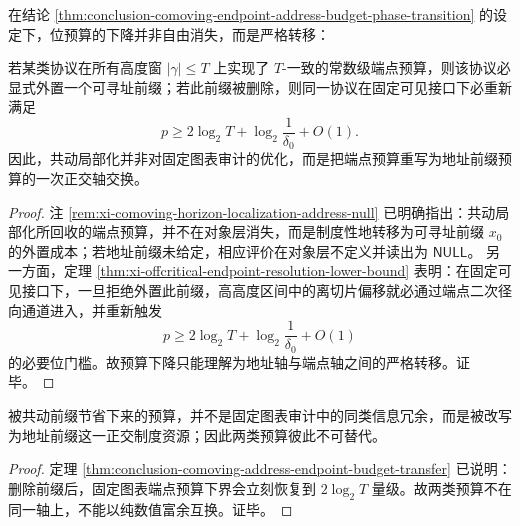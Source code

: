 \begin{theorem}[地址预算与端点预算的正交转移]\label{thm:conclusion-comoving-address-endpoint-budget-transfer}
在结论 \ref{thm:conclusion-comoving-endpoint-address-budget-phase-transition} 的设定下，位预算的下降并非自由消失，而是严格转移：

若某类协议在所有高度窗 \(|\gamma|\le T\) 上实现了 \(T\)-一致的常数级端点预算，则该协议必显式外置一个可寻址前缀；若此前缀被删除，则同一协议在固定可见接口下必重新满足
\[
p\ge 2\log_2T+\log_2\frac1{\delta_0}+O(1).
\]
因此，共动局部化并非对固定图表审计的优化，而是把端点预算重写为地址前缀预算的一次正交轴交换。
\end{theorem}
\begin{proof}
注 \ref{rem:xi-comoving-horizon-localization-address-null} 已明确指出：共动局部化所回收的端点预算，并不在对象层消失，而是制度性地转移为可寻址前缀 \(x_0\) 的外置成本；若地址前缀未给定，相应评价在对象层不定义并读出为 \(\mathsf{NULL}\)。
另一方面，定理 \ref{thm:xi-offcritical-endpoint-resolution-lower-bound} 表明：在固定可见接口下，一旦拒绝外置此前缀，高高度区间中的离切片偏移就必通过端点二次径向通道进入，并重新触发
\[
p\ge 2\log_2T+\log_2\frac1{\delta_0}+O(1)
\]
的必要位门槛。故预算下降只能理解为地址轴与端点轴之间的严格转移。证毕。
\end{proof}

\begin{corollary}[地址轴与端点轴的不可替代性]\label{cor:conclusion-comoving-address-endpoint-axis-exchange}
被共动前缀节省下来的预算，并不是固定图表审计中的同类信息冗余，而是被改写为地址前缀这一正交制度资源；因此两类预算彼此不可替代。
\end{corollary}
\begin{proof}
定理 \ref{thm:conclusion-comoving-address-endpoint-budget-transfer} 已说明：删除前缀后，固定图表端点预算下界会立刻恢复到 \(2\log_2T\) 量级。故两类预算不在同一轴上，不能以纯数值富余互换。证毕。
\end{proof}

